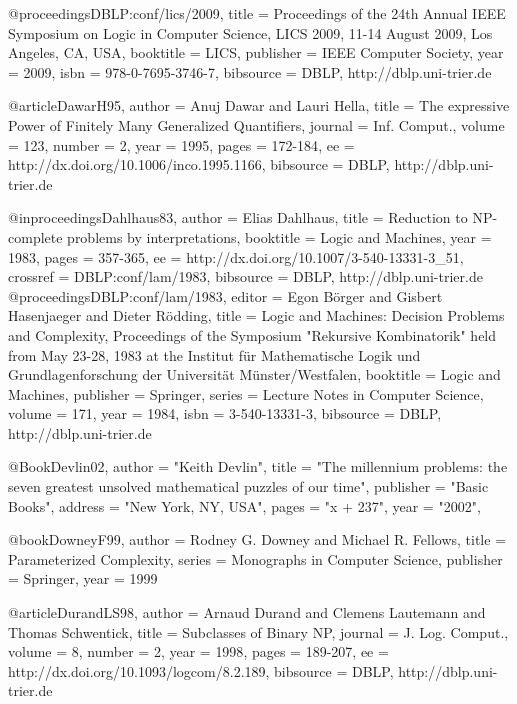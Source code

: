 \documentclass{article}
\begin{document}
@proceedings{DBLP:conf/lics/2009,
  title     = {Proceedings of the 24th Annual IEEE Symposium on Logic in
               Computer Science, LICS 2009, 11-14 August 2009, Los Angeles,
               CA, USA},
  booktitle = {LICS},
  publisher = {IEEE Computer Society},
  year      = {2009},
  isbn      = {978-0-7695-3746-7},
  bibsource = {DBLP, http://dblp.uni-trier.de}
}


@article{DawarH95,
  author    = {Anuj Dawar and
               Lauri Hella},
  title     = {The expressive Power of Finitely Many Generalized Quantifiers},
  journal   = {Inf. Comput.},
  volume    = {123},
  number    = {2},
  year      = {1995},
  pages     = {172-184},
  ee        = {http://dx.doi.org/10.1006/inco.1995.1166},
  bibsource = {DBLP, http://dblp.uni-trier.de}
}

@inproceedings{Dahlhaus83,
  author    = {Elias Dahlhaus},
  title     = {Reduction to {NP}-complete problems by interpretations},
  booktitle = {Logic and Machines},
  year      = {1983},
  pages     = {357-365},
  ee        = {http://dx.doi.org/10.1007/3-540-13331-3_51},
  crossref  = {DBLP:conf/lam/1983},
  bibsource = {DBLP, http://dblp.uni-trier.de}
}
@proceedings{DBLP:conf/lam/1983,
  editor    = {Egon B{\"o}rger and
               Gisbert Hasenjaeger and
               Dieter R{\"o}dding},
  title     = {Logic and Machines: Decision Problems and Complexity, Proceedings
               of the Symposium "Rekursive Kombinatorik" held from May
               23-28, 1983 at the Institut f{\"u}r Mathematische Logik
               und Grundlagenforschung der Universit{\"a}t M{\"u}nster/Westfalen},
  booktitle = {Logic and Machines},
  publisher = {Springer},
  series    = {Lecture Notes in Computer Science},
  volume    = {171},
  year      = {1984},
  isbn      = {3-540-13331-3},
  bibsource = {DBLP, http://dblp.uni-trier.de}
}


@Book{Devlin02,
  author =       "Keith Devlin",
  title =        "The millennium problems: the seven greatest unsolved
                 mathematical puzzles of our time",
  publisher =    "Basic Books",
  address =      "New York, NY, USA",
  pages =        "x + 237",
  year =         "2002",
}

@book{DowneyF99,
  author = {Rodney G. Downey and Michael R. Fellows},
  title  = {Parameterized Complexity},
  series = {Monographs in Computer Science},
  publisher = {Springer},
  year = 1999
}

@article{DurandLS98,
  author    = {Arnaud Durand and
               Clemens Lautemann and
               Thomas Schwentick},
  title     = {Subclasses of Binary {NP}},
  journal   = {J. Log. Comput.},
  volume    = {8},
  number    = {2},
  year      = {1998},
  pages     = {189-207},
  ee        = {http://dx.doi.org/10.1093/logcom/8.2.189},
  bibsource = {DBLP, http://dblp.uni-trier.de}
}
\end{document}
